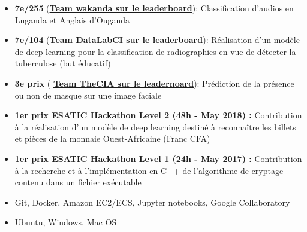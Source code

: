\documentclass[11pt,a4paper,ragged2e, withhyper]{altacv}
\begin{document}


\smallskip
\begin{itemize}
      \item \textbf{{7}{e}/255 } (\textbf{\href{https://zindi.africa/competitions/giz-nlp-agricultural-keyword-spotter/leaderboard}{Team wakanda sur le leaderboard}}): Classification d'audios en Luganda et Anglais d'Ouganda
      \item \textbf{{7}{e}/104 } (\textbf{\href{https://zindi.africa/competitions/runmila-ai-institute-minohealth-ai-labs-tuberculosis-classification-via-x-rays-challenge/leaderboard}{Team DataLabCI sur le leaderboard}}): Réalisation d'un modèle de deep learning pour la classification de radiographies en vue de détecter la tuberculose (but éducatif)
      \item \textbf{{3}{e} prix } (\textbf{ \href{https://zindi.africa/competitions/spot-the-mask-challenge}{Team TheCIA sur le leadernoard}}): Prédiction de la présence ou non de masque sur une image faciale
      \item \textbf{{1}{er} prix ESATIC Hackathon Level 2 (48h - May 2018) :} Contribution à la réalisation d'un modèle de deep learning destiné à reconnaître les billets et pièces de la monnaie Ouest-Africaine (Franc CFA)
      \item \textbf{{1}{er} prix ESATIC Hackathon Level 1 (24h - May 2017) :} Contribution à la recherche et à l'implémentation en C++ de l'algorithme de cryptage contenu dans un fichier exécutable

\end{itemize}

\smallskip
\begin{itemize}
      \item Git, Docker, Amazon EC2/ECS, Jupyter notebooks, Google Collaboratory
            \smallskip

      \item Ubuntu, Windows, Mac OS
            \smallskip
\end{itemize}

%
\end{document}
